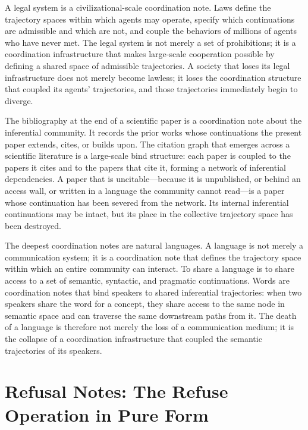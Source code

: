 \documentclass[12pt, a4paper]{article}
\theoremstyle{plain}
\theoremstyle{definition}
\theoremstyle{remark}
\begin{document}
A legal system is a civilizational-scale coordination note. Laws define the
trajectory spaces within which agents may operate, specify which continuations are
admissible and which are not, and couple the behaviors of millions of agents who
have never met. The legal system is not merely a set of prohibitions; it is a
coordination infrastructure that makes large-scale cooperation possible by defining
a shared space of admissible trajectories. A society that loses its legal
infrastructure does not merely become lawless; it loses the coordination structure
that coupled its agents' trajectories, and those trajectories immediately begin
to diverge.

The bibliography at the end of a scientific paper is a coordination note about the
inferential community. It records the prior works whose continuations the present
paper extends, cites, or builds upon. The citation graph that emerges across a
scientific literature is a large-scale bind structure: each paper is coupled to the
papers it cites and to the papers that cite it, forming a network of inferential
dependencies. A paper that is uncitable---because it is unpublished, or behind an
access wall, or written in a language the community cannot read---is a paper whose
continuation has been severed from the network. Its internal inferential
continuations may be intact, but its place in the collective trajectory space has
been destroyed.

The deepest coordination notes are natural languages. A language is not merely a
communication system; it is a coordination note that defines the trajectory space
within which an entire community can interact. To share a language is to share
access to a set of semantic, syntactic, and pragmatic continuations. Words are
coordination notes that bind speakers to shared inferential trajectories: when two
speakers share the word for a concept, they share access to the same node in
semantic space and can traverse the same downstream paths from it. The death of a
language is therefore not merely the loss of a communication medium; it is the
collapse of a coordination infrastructure that coupled the semantic trajectories
of its speakers.

\section{Refusal Notes: The Refuse Operation in Pure Form}
\end{document}
